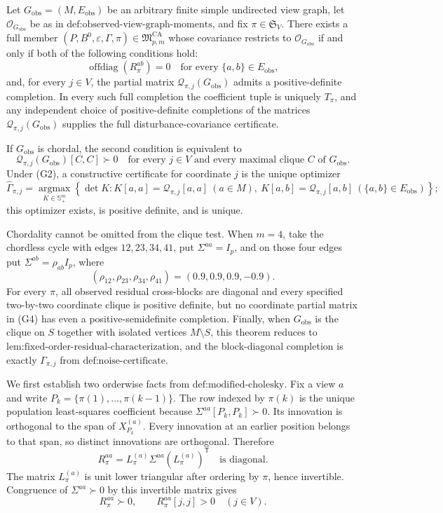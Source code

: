 Let \(G_{\mathrm{obs}}=(M,E_{\mathrm{obs}})\) be an arbitrary finite simple undirected view graph, let \(\mathcal O_{G_{\mathrm{obs}}}\) be as in \(\text{def:observed-view-graph-moments}\), and fix \(\pi\in\mathfrak S_V\).  There exists a full member \((P,B^0,\varepsilon,\Gamma,\pi)\in\mathfrak M_{p,m}^{\mathrm{CA}}\) whose covariance restricts to \(\mathcal O_{G_{\mathrm{obs}}}\) if and only if both of the following conditions hold:
\[
\operatorname{offdiag}(R_\pi^{ab})=0
\quad\text{for every }\{a,b\}\in E_{\mathrm{obs}},
\tag{G1}
\]
and, for every \(j\in V\), the partial matrix \(\mathcal Q_{\pi,j}(G_{\mathrm{obs}})\) admits a positive-definite completion.  In every such full completion the coefficient tuple is uniquely \(T_\pi\), and any independent choice of positive-definite completions of the matrices \(\mathcal Q_{\pi,j}(G_{\mathrm{obs}})\) supplies the full disturbance-covariance certificate.

If \(G_{\mathrm{obs}}\) is chordal, the second condition is equivalent to
\[
\mathcal Q_{\pi,j}(G_{\mathrm{obs}})[C,C]\succ0
\quad\text{for every }j\in V
\text{ and every maximal clique }C\text{ of }G_{\mathrm{obs}}.
\tag{G2}
\]
Under (G2), a constructive certificate for coordinate \(j\) is the unique optimizer
\[
\widehat\Gamma_{\pi,j}
=\operatorname*{argmax}_{K\in\mathbb S_+^m}
\left\{\det K:
K[a,a]=\mathcal Q_{\pi,j}[a,a]\ (a\in M),\ 
K[a,b]=\mathcal Q_{\pi,j}[a,b]\ (\{a,b\}\in E_{\mathrm{obs}})
\right\};
\tag{G3}
\]
this optimizer exists, is positive definite, and is unique.

Chordality cannot be omitted from the clique test.  When \(m=4\), take the chordless cycle with edges \(12,23,34,41\), put \(\Sigma^{aa}=I_p\), and on those four edges put \(\Sigma^{ab}=\rho_{ab}I_p\), where
\[
(\rho_{12},\rho_{23},\rho_{34},\rho_{41})=(0.9,0.9,0.9,-0.9).
\tag{G4}
\]
For every \(\pi\), all observed residual cross-blocks are diagonal and every specified two-by-two coordinate clique is positive definite, but no coordinate partial matrix in (G4) has even a positive-semidefinite completion.  Finally, when \(G_{\mathrm{obs}}\) is the clique on \(S\) together with isolated vertices \(M\setminus S\), this theorem reduces to \(\text{lem:fixed-order-residual-characterization}\), and the block-diagonal completion is exactly \(\Gamma_{\pi,j}\) from \(\text{def:noise-certificate}\).

We first establish two orderwise facts from \(\text{def:modified-cholesky}\).  Fix a view \(a\) and write \(P_k=\{\pi(1),\ldots,\pi(k-1)\}\).  The row indexed by \(\pi(k)\) is the unique population least-squares coefficient because \(\Sigma^{aa}[P_k,P_k]\succ0\).  Its innovation is orthogonal to the span of \(X_{P_k}^{(a)}\).  Every innovation at an earlier position belongs to that span, so distinct innovations are orthogonal.  Therefore
\[
R_\pi^{aa}=L_\pi^{(a)}\Sigma^{aa}(L_\pi^{(a)})^{\mathsf T}
\quad\text{is diagonal}.
\tag{24}
\]
The matrix \(L_\pi^{(a)}\) is unit lower triangular after ordering by \(\pi\), hence invertible.  Congruence of \(\Sigma^{aa}\succ0\) by this invertible matrix gives
\[
R_\pi^{aa}\succ0,
\qquad
R_\pi^{aa}[j,j]>0
\quad(j\in V).
\tag{25}
\]

